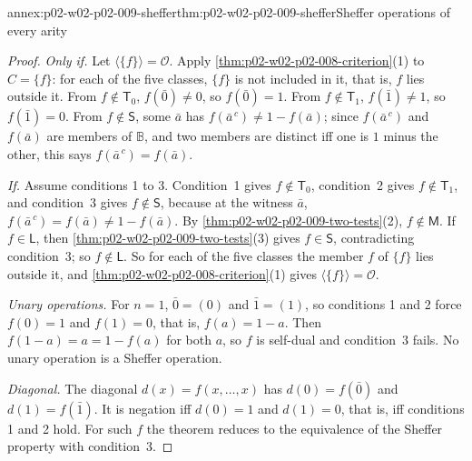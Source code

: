 \begin{annexitem}{annex:p02-w02-p02-009-sheffer}{thm:p02-w02-p02-009-sheffer}{Sheffer operations of every arity}
\begin{proof}
\emph{Only if.}  Let \(\langle\{f\}\rangle=\mathcal O\).  Apply
\cref{thm:p02-w02-p02-008-criterion}(1) to \(C=\{f\}\): for each of the five
classes, \(\{f\}\) is not included in it, that is, \(f\) lies outside it.
From \(f\notin\mathsf T_0\), \(f(\bar0)\neq0\), so \(f(\bar0)=1\).  From
\(f\notin\mathsf T_1\), \(f(\bar1)\neq1\), so \(f(\bar1)=0\).  From
\(f\notin\mathsf S\), some \(\bar a\) has \(f(\bar a^{\,c})\neq1-f(\bar a)\);
since \(f(\bar a^{\,c})\) and \(f(\bar a)\) are members of \(\mathbb B\), and
two members are distinct iff one is \(1\) minus the other, this says
\(f(\bar a^{\,c})=f(\bar a)\).

\emph{If.}  Assume conditions 1 to 3.  Condition~1 gives
\(f\notin\mathsf T_0\), condition~2 gives \(f\notin\mathsf T_1\), and
condition~3 gives \(f\notin\mathsf S\), because at the witness \(\bar a\),
\(f(\bar a^{\,c})=f(\bar a)\neq1-f(\bar a)\).  By
\cref{thm:p02-w02-p02-009-two-tests}(2), \(f\notin\mathsf M\).  If
\(f\in\mathsf L\), then \cref{thm:p02-w02-p02-009-two-tests}(3) gives
\(f\in\mathsf S\), contradicting condition~3; so \(f\notin\mathsf L\).  So
for each of the five classes the member \(f\) of \(\{f\}\) lies outside it,
and \cref{thm:p02-w02-p02-008-criterion}(1) gives
\(\langle\{f\}\rangle=\mathcal O\).

\emph{Unary operations.}  For \(n=1\), \(\bar0=(0)\) and \(\bar1=(1)\), so
conditions 1 and 2 force \(f(0)=1\) and \(f(1)=0\), that is,
\(f(a)=1-a\).  Then \(f(1-a)=a=1-f(a)\) for both \(a\), so \(f\) is
self-dual and condition~3 fails.  No unary operation is a Sheffer operation.

\emph{Diagonal.}  The diagonal \(d(x)=f(x,\ldots,x)\) has \(d(0)=f(\bar0)\)
and \(d(1)=f(\bar1)\).  It is negation iff \(d(0)=1\) and \(d(1)=0\), that
is, iff conditions 1 and 2 hold.  For such \(f\) the theorem reduces to the
equivalence of the Sheffer property with condition~3.
\end{proof}
\end{annexitem}


